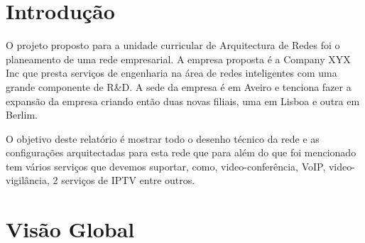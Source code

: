 \documentclass[pdftex,12pt,a4paper]{report}
\begin{document}
\renewcommand{\headrulewidth}{0pt}

\fancyhead{}
\fancyfoot{}
\rfoot{\thepage}

\renewcommand*\contentsname{Conteúdos}
\renewcommand*\figurename{Figura}
\renewcommand*\tablename{Tabela}

\tableofcontents
\renewcommand{\headrulewidth}{0.15pt}
\renewcommand{\thechapter}{}

\clearpage

\section{Introdução}
O projeto proposto para a unidade curricular de Arquitectura de Redes foi o planeamento de uma rede empresarial. 
	A empresa proposta é a Company XYX Inc que presta serviços de engenharia na área de redes inteligentes com uma grande componente de R\&D. A sede da empresa é em Aveiro e tenciona fazer a expansão da empresa criando então duas novas filiais, uma em Lisboa e outra em Berlim.
	
	O objetivo deste relatório é mostrar   todo o desenho técnico da rede e as configurações arquitectadas para esta rede que para além do que foi mencionado tem vários serviços que devemos suportar, como, video-conferência, VoIP, video-vigilância, 2 serviços de IPTV entre outros.

\newpage
\section{Visão Global}
\end{document}
